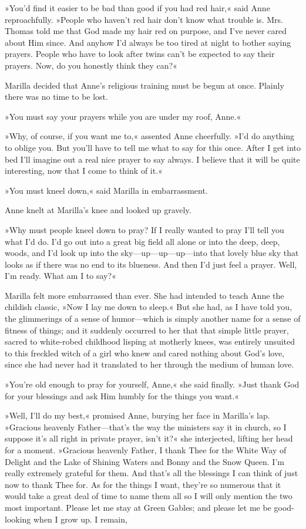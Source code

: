»You'd find it easier to be bad than good if you had red hair,« said Anne reproachfully. »People who haven't red hair don't know what trouble is. Mrs. Thomas told me that God made my hair red on purpose, and I've never cared about Him since. And anyhow I'd always be too tired at night to bother saying prayers. People who have to look after twins can't be expected to say their prayers. Now, do you honestly think they can?«

Marilla decided that Anne's religious training must be begun at once. Plainly there was no time to be lost.

»You must say your prayers while you are under my roof, Anne.«

»Why, of course, if you want me to,« assented Anne cheerfully. »I'd do anything to oblige you. But you'll have to tell me what to say for this once. After I get into bed I'll imagine out a real nice prayer to say always. I believe that it will be quite interesting, now that I come to think of it.«

»You must kneel down,« said Marilla in embarrassment.

Anne knelt at Marilla's knee and looked up gravely.

»Why must people kneel down to pray? If I really wanted to pray I'll tell you what I'd do. I'd go out into a great big field all alone or into the deep, deep, woods, and I'd look up into the sky—up—up—up—into that lovely blue sky that looks as if there was no end to its blueness. And then I'd just feel a prayer. Well, I'm ready. What am I to say?«

Marilla felt more embarrassed than ever. She had intended to teach Anne the childish classic, »Now I lay me down to sleep.« But she had, as I have told you, the glimmerings of a sense of humor—which is simply another name for a sense of fitness of things; and it suddenly occurred to her that that simple little prayer, sacred to white-robed childhood lisping at motherly knees, was entirely unsuited to this freckled witch of a girl who knew and cared nothing about God's love, since she had never had it translated to her through the medium of human love.

»You're old enough to pray for yourself, Anne,« she said finally. »Just thank God for your blessings and ask Him humbly for the things you want.«

»Well, I'll do my best,« promised Anne, burying her face in Marilla's lap. »Gracious heavenly Father—that's the way the ministers say it in church, so I suppose it's all right in private prayer, isn't it?« she interjected, lifting her head for a moment. »Gracious heavenly Father, I thank Thee for the White Way of Delight and the Lake of Shining Waters and Bonny and the Snow Queen. I'm really extremely grateful for them. And that's all the blessings I can think of just now to thank Thee for. As for the things I want, they're so numerous that it would take a great deal of time to name them all so I will only mention the two most important. Please let me stay at Green Gables; and please let me be good-looking when I grow up. I remain,

